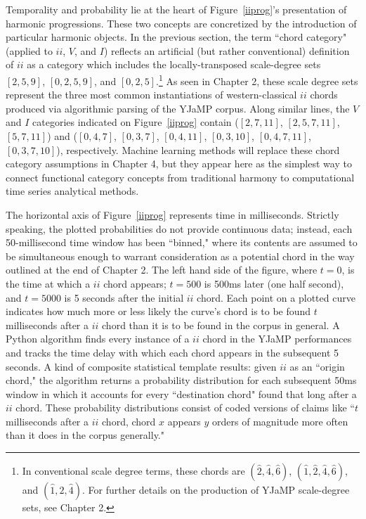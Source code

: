 Temporality and probability lie at the heart of Figure~\ref{iiprog}'s presentation of harmonic progressions.  These two concepts are concretized by the introduction of particular harmonic objects.  In the previous section, the term ``chord category" (applied to $ii$, $V$, and $I$) reflects an artificial (but rather conventional) definition of $ii$ as a category which includes the locally-transposed scale-degree sets $[2,5,9]$, $[0,2,5,9]$, and $[0,2,5]$.\footnote{In conventional scale degree terms, these chords are $(\hat{2},\hat{4},\hat{6})$, $(\hat{1},\hat{2},\hat{4}, \hat{6})$, and $(\hat{1},\hat{2},\hat{4})$.  For further details on the production of YJaMP scale-degree sets, see Chapter 2.}  As seen in Chapter 2, these scale degree sets represent the three most common instantiations of western-classical $ii$ chords produced via algorithmic parsing of the YJaMP corpus.  Along similar lines, the $V$ and $I$ categories indicated on Figure~\ref{iiprog} contain ($[2,7,11]$, $[2,5,7,11]$, $[5,7,11]$) and ($[0,4,7]$, $[0,3,7]$, $[0,4,11]$, $[0,3,10]$, $[0,4,7,11]$, $[0,3,7,10]$), respectively.  Machine learning methods will replace these chord category assumptions in Chapter 4, but they appear here as the simplest way to connect functional category concepts from traditional harmony to computational time series analytical methods.

The horizontal axis of Figure~\ref{iiprog} represents time in milliseconds.  Strictly speaking, the plotted probabilities do not provide continuous data; instead, each 50-millisecond time window has been ``binned," where its contents are assumed to be simultaneous enough to warrant consideration as a potential chord in the way outlined at the end of Chapter 2.  The left hand side of the figure, where $t=0$, is the time at which a $ii$ chord appears; $t=500$ is 500ms later (one half second), and $t=5000$ is 5 seconds after the initial $ii$ chord.  Each point on a plotted curve indicates how much more or less likely the curve's chord is to be found $t$ milliseconds after a $ii$ chord than it is to be found in the corpus in general.  A Python algorithm finds every instance of a $ii$ chord in the YJaMP performances and tracks the time delay with which each chord appears in the subsequent 5 seconds.  A kind of composite statistical template results: given $ii$ as an ``origin chord," the algorithm returns a probability distribution for each subsequent 50ms window in which it accounts for every ``destination chord" found that long after a $ii$ chord.  These probability distributions consist of coded versions of claims like ``$t$ milliseconds after a $ii$ chord, chord $x$ appears $y$ orders of magnitude more often than it does in the corpus generally."  


